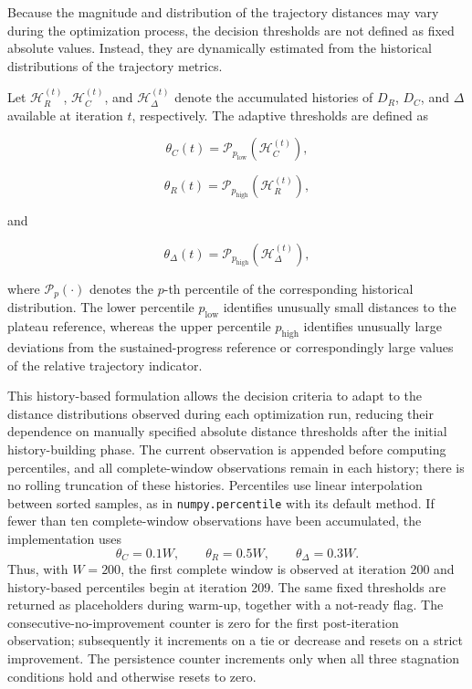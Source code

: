 \documentclass[journal,article,submit,moreauthors]{Definitions/mdpi}
\begin{document}
Because the magnitude and distribution of the trajectory distances may vary
during the optimization process, the decision thresholds are not defined as
fixed absolute values. Instead, they are dynamically estimated from the
historical distributions of the trajectory metrics.

Let $\mathcal{H}_{R}^{(t)}$, $\mathcal{H}_{C}^{(t)}$, and
$\mathcal{H}_{\Delta}^{(t)}$ denote the accumulated histories of $D_R$,
$D_C$, and $\Delta$ available at iteration $t$, respectively. The adaptive
thresholds are defined as

\begin{equation}
\theta_C(t)
=
\mathcal{P}_{p_{\mathrm{low}}}
\left(\mathcal{H}_{C}^{(t)}\right),
\label{eq:threshold_c}
\end{equation}

\begin{equation}
\theta_R(t)
=
\mathcal{P}_{p_{\mathrm{high}}}
\left(\mathcal{H}_{R}^{(t)}\right),
\label{eq:threshold_r}
\end{equation}

and

\begin{equation}
\theta_{\Delta}(t)
=
\mathcal{P}_{p_{\mathrm{high}}}
\left(\mathcal{H}_{\Delta}^{(t)}\right),
\label{eq:threshold_delta}
\end{equation}

where $\mathcal{P}_{p}(\cdot)$ denotes the $p$-th percentile of the
corresponding historical distribution. The lower percentile
$p_{\mathrm{low}}$ identifies unusually small distances to the plateau
reference, whereas the upper percentile $p_{\mathrm{high}}$ identifies
unusually large deviations from the sustained-progress reference or
correspondingly large values of the relative trajectory indicator.

This history-based formulation allows the decision criteria to adapt to the
distance distributions observed during each optimization run, reducing
their dependence on manually specified absolute distance thresholds after
the initial history-building phase. The current observation is appended
before computing percentiles, and all complete-window observations remain
in each history; there is no rolling truncation of these histories.
Percentiles use linear interpolation between sorted samples, as in
\texttt{numpy.percentile} with its default method. If fewer than ten
complete-window observations have been accumulated, the implementation uses
\begin{equation}
\theta_C=0.1W,\qquad\theta_R=0.5W,\qquad\theta_\Delta=0.3W.
\label{eq:initial_thresholds}
\end{equation}
Thus, with $W=200$, the first complete window is observed at iteration 200
and history-based percentiles begin at iteration 209. The same fixed
thresholds are returned as placeholders during warm-up, together with a
not-ready flag. The consecutive-no-improvement counter is zero for the
first post-iteration observation; subsequently it increments on a tie or
decrease and resets on a strict improvement. The persistence counter
increments only when all three stagnation conditions hold and otherwise
resets to zero.
\end{document}
